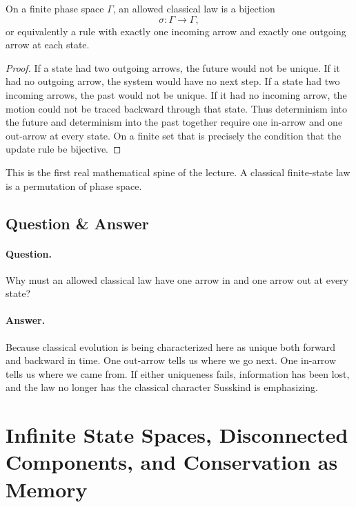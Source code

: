 \begin{proposition}
On a finite phase space \(\Gamma\), an allowed classical law is a bijection
\begin{equation}
\sigma:\Gamma\to\Gamma,
\end{equation}
or equivalently a rule with exactly one incoming arrow and exactly one outgoing arrow at each state.
\end{proposition}

\begin{proof}
If a state had two outgoing arrows, the future would not be unique. If it had no outgoing arrow, the system would have no next step. If a state had two incoming arrows, the past would not be unique. If it had no incoming arrow, the motion could not be traced backward through that state. Thus determinism into the future and determinism into the past together require one in-arrow and one out-arrow at every state. On a finite set that is precisely the condition that the update rule be bijective.
\end{proof}

This is the first real mathematical spine of the lecture. A classical finite-state law is a permutation of phase space.

\subsection{Question \& Answer}

\paragraph{Question.} Why must an allowed classical law have one arrow in and one arrow out at every state?

\paragraph{Answer.} Because classical evolution is being characterized here as unique both forward and backward in time. One out-arrow tells us where we go next. One in-arrow tells us where we came from. If either uniqueness fails, information has been lost, and the law no longer has the classical character Susskind is emphasizing.

\section{Infinite State Spaces, Disconnected Components, and Conservation as Memory}

